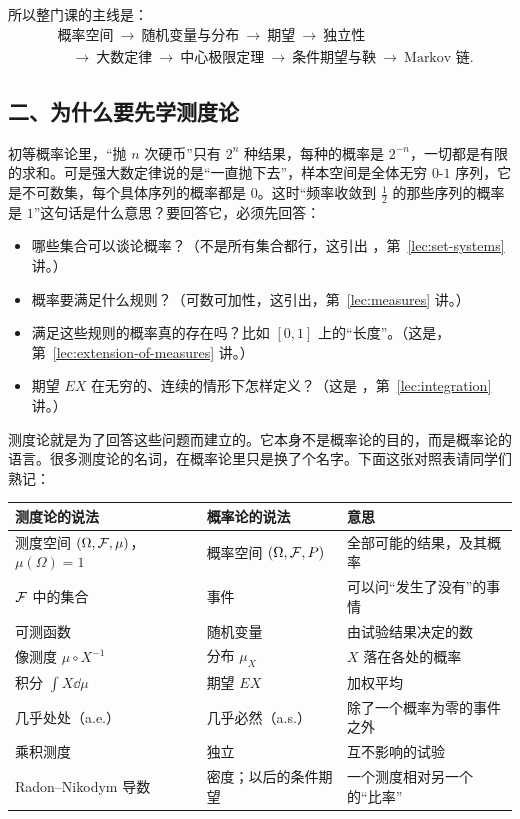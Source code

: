 所以整门课的主线是：
\[
\begin{aligned}
&\text{概率空间}\ \to\ \text{随机变量与分布}\ \to\ \text{期望}\ \to\ \text{独立性}\\
&\quad\to\ \text{大数定律}\ \to\ \text{中心极限定理}\ \to\ \text{条件期望与鞅}\ \to\ \text{Markov 链}.
\end{aligned}
\]

\subsection*{二、为什么要先学测度论}

初等概率论里，“抛 $n$ 次硬币”只有 $2^n$ 种结果，每种的概率是 $2^{-n}$，一切都是有限的求和。可是强大数定律说的是“一直抛下去”，样本空间是全体无穷 $0$-$1$ 序列，它是不可数集，每个具体序列的概率都是 $0$。这时“频率收敛到 $\frac12$ 的那些序列的概率是 $1$”这句话是什么意思？要回答它，必须先回答：
\begin{itemize}
\item 哪些集合可以谈论概率？（不是所有集合都行，这引出 ，第~\ref{lec:set-systems} 讲。）
\item 概率要满足什么规则？（可数可加性，这引出，第~\ref{lec:measures} 讲。）
\item 满足这些规则的概率真的存在吗？比如 $[0,1]$ 上的“长度”。（这是，第~\ref{lec:extension-of-measures} 讲。）
\item 期望 $EX$ 在无穷的、连续的情形下怎样定义？（这是 ，第~\ref{lec:integration} 讲。）
\end{itemize}
测度论就是为了回答这些问题而建立的。它本身不是概率论的目的，而是概率论的语言。很多测度论的名词，在概率论里只是换了个名字。下面这张对照表请同学们熟记：

\begin{center}
\small
\begin{tabular}{p{14.5em}p{10.5em}p{11em}}
\toprule
测度论的说法 & 概率论的说法 & 意思\\
\midrule
测度空间 $(\Omega,\mathcal{F},\mu)$，$\mu(\Omega)=1$ & 概率空间 $(\Omega,\mathcal{F},P)$ & 全部可能的结果，及其概率\\
$\mathcal{F}$ 中的集合 & 事件 & 可以问“发生了没有”的事情\\
可测函数 & 随机变量 & 由试验结果决定的数\\
像测度 $\mu\circ X^{-1}$ & 分布 $\mu_X$ & $X$ 落在各处的概率\\
积分 $\int X\dd\mu$ & 期望 $EX$ & 加权平均\\
几乎处处（a.e.） & 几乎必然（a.s.） & 除了一个概率为零的事件之外\\
乘积测度 & 独立 & 互不影响的试验\\
Radon--Nikodym 导数 & 密度；以后的条件期望 & 一个测度相对另一个的“比率”\\
\bottomrule
\end{tabular}
\end{center}

